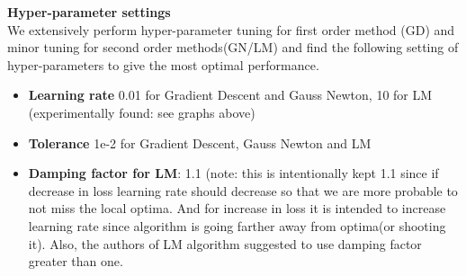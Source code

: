 \documentclass[journal]{IEEEtran}
\begin{document}
\textbf{Hyper-parameter settings} \\
We extensively perform hyper-parameter tuning for first order method (GD) and minor tuning for second order methods(GN/LM) and find the following setting of hyper-parameters to give the most optimal performance. 
\begin{itemize}
\item \textbf{Learning rate} 0.01 for Gradient Descent and Gauss Newton, 10 for LM (experimentally found: see graphs above)
\item \textbf{Tolerance} 1e-2 for Gradient Descent, Gauss Newton and LM 
\item \textbf{Damping factor for LM}: 1.1 (note: this is intentionally kept 1.1 since if decrease in loss learning rate should decrease so that we are more probable to not miss the local optima. And for increase in loss it is intended to increase learning rate since algorithm is going farther away from optima(or shooting it). 
Also, the authors of LM algorithm \cite{gavin2019levenberg} suggested to use damping factor greater than one. \\
\end{itemize}
\end{document}
